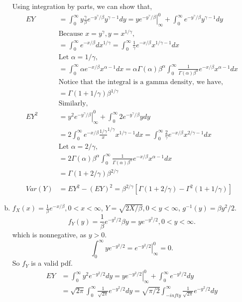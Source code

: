 \documentclass[letter]{article}
\newcommand{\sqtpi}{\sqrt{2\pi}}
\newcommand{\intzi}{\int_0^\infty}
\begin{document}
\begin{enumerate}[(a)]
    Using integration by parts, we can show that,
    \begin{align*}
    EY & = \intzi y \frac{\gamma}{\beta} e^{-y^\gamma/\beta} y^{\gamma-1} dy = \left. y e^{-y^\gamma/\beta} \right|^0_\infty + \intzi e^{-y^\gamma/\beta} y^{\gamma-1} dy \\
    & \text{Because $x = y^\gamma, y = x^{1/\gamma}$},\\
    & = \intzi e^{-x/\beta} dx^{1/\gamma} = \intzi \frac{1}{\gamma} e^{-x/\beta} x^{1/\gamma -1} dx \\
    & \text{Let $\alpha = 1/\gamma$},\\
    & = \intzi \alpha e^{-x/\beta}  x^{\alpha-1} dx = \alpha \Gamma(\alpha) \beta^\alpha \intzi \frac{1}{\Gamma(\alpha)\beta^\alpha} e^{-x/\beta} x^{\alpha-1}dx \\
    & \text{Notice that the integral is a gamma density, we have},\\
    & = \Gamma(1 + 1/\gamma) \beta^{1/\gamma}\\
    & \text{Similarly},\\
    EY^2 & = \left. y^2 e^{-y^\gamma/\beta} \right|^0_\infty + \intzi 2e^{-y^\gamma/\beta} y dy \\
    & = 2 \intzi e^{-x/\beta} \frac{1/\gamma} x^{1/\gamma} x^{1/\gamma-1} dx = \intzi \frac{2}{\gamma} e^{-x/\beta} x^{2/\gamma -1} dx \\
    & \text{Let $\alpha= 2/\gamma$},\\
    & = 2\Gamma(\alpha) \beta^\alpha \intzi \frac{1}{\Gamma(\alpha)\beta^\alpha} e^{-x/\beta} x^{\alpha-1} dx \\
    & = \Gamma(1+2/\gamma) \beta^{2/\gamma}\\
    \\
    Var(Y) & = EY^2 - (EY)^2 = \beta^{2/\gamma}\left[\Gamma(1+2/\gamma) - \Gamma^2(1+1/\gamma)\right]
    \end{align*}
    \item $f_X(x) = \frac{1}{\beta} e^{-x/\beta}, 0 < x < \infty$, $Y=\sqrt{2X/\beta}, 0 < y < \infty$, $g^{-1}(y) = \beta y^2/2$. 
    \[
    f_Y(y) = \frac{1}{\beta} e^{-y^2/2}\beta y = y e^{-y^2/2}, 0 < y < \infty.
    \]
    which is nonnegative, as $y > 0$.
    \[
    \intzi ye^{-y^2/2} = \left. e^{-y^2/2} \right|^0_\infty = 0.
    \]
    So $f_Y$ is a valid pdf.
    \begin{align*}
    EY & = \intzi y^2 e^{-y^2/2}dy = \left.y e^{-y^2/2}\right|^0_\infty + \intzi e^{-y^2/2}dy \\
    & = \sqtpi \intzi \frac{1}{\sqtpi} e^{-y^2/2}dy = \sqrt{\pi/2} \int_{-infty}^\infty \frac{1}{\sqtpi} e^{-y^2/2}dy \\

\end{align*}
\end{enumerate}
\end{document}
